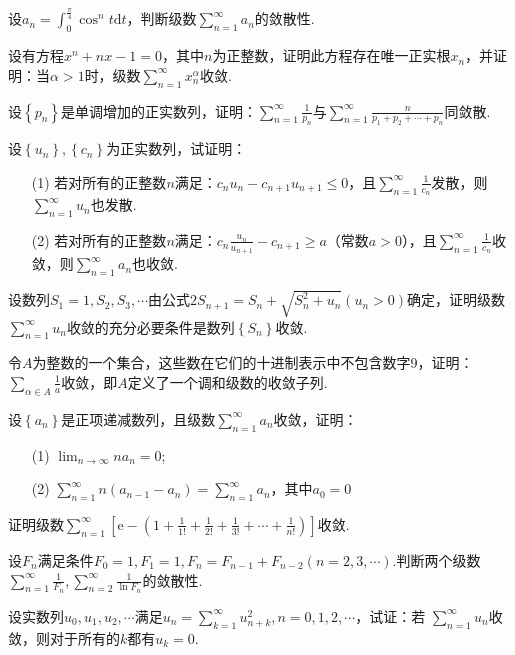 \begin{xiti}
	
	\item 设$a_{n}=\int_{0}^{\frac{\pi}{4}} \cos ^{n} t \mathrm{d} t$，判断级数$\sum_{n=1}^{\infty} a_{n}$的敛散性.
	\item 设有方程$x^{n}+n x-1=0$，其中$n$为正整数，证明此方程存在唯一正实根$x_{n}$，并证明：当$\alpha>1$时，级数$\sum_{n=1}^{\infty} x_{n}^{\alpha}$收敛.
	\item 设$\left\{p_{n}\right\}$是单调增加的正实数列，证明：$\sum_{n=1}^{\infty} \frac{1}{p_{n}}$与$\sum_{n=1}^{\infty} \frac{n}{p_{1}+p_{2}+\cdots+p_{n}}$同敛散.
	\item 设$\left\{u_{n}\right\},\left\{c_{n}\right\}$为正实数列，试证明：
	\begin{enumerate}
		\item [(1)]若对所有的正整数$n$满足：$c_{n} u_{n}-c_{n+1} u_{n+1} \leqslant 0$，且$\sum_{n=1}^{\infty} \frac{1}{c_{n}}$发散，则$\sum_{n=1}^{\infty} u_{n}$也发散.
		
		\item [(2)]若对所有的正整数$n$满足：$c_{n} \frac{u_{n}}{u_{n+1}}-c_{n+1} \geqslant a$（常数$a>0$），且$\sum_{n=1}^{\infty} \frac{1}{c_{n}}$收敛，则$\sum_{n=1}^{\infty} a_{n}$也收敛.
	\end{enumerate}
	\item 设数列$S_{1}=1, S_{2}, S_{3}, \cdots$由公式$2 S_{n+1}=S_{n}+\sqrt{S_{n}^{2}+u_{n}}\left(u_{n}>0\right)$确定，证明级数$\sum_{n=1}^{\infty} u_{n}$收敛的充分必要条件是数列$\left\{S_{n}\right\}$收敛.
	
	
	\item 令$A$为整数的一个集合，这些数在它们的十进制表示中不包含数字9，证明：$\sum_{\alpha \in A} \frac{1}{a}$收敛，即$A$定义了一个调和级数的收敛子列.
	
	\item 设$\left\{a_{n}\right\}$是正项递减数列，且级数$\sum_{n=1}^{\infty} a_{n}$收敛，证明：
	\begin{enumerate}
		\item [(1)]$\lim _{n \rightarrow \infty} n a_{n}=0$;
		\item [(2)]$\sum_{n=1}^{\infty} n\left(a_{n-1}-a_{n}\right)=\sum_{n=1}^{\infty} a_{n}$，其中$a_{0}=0$
	\end{enumerate}
	\item 证明级数$\sum_{n=1}^{\infty}\left[\mathrm{e}-\left(1+\frac{1}{1 !}+\frac{1}{2 !}+\frac{1}{3 !}+\cdots+\frac{1}{n !}\right)\right]$收敛.
	\item 设$F_{n}$满足条件$F_{0}=1, F_{1}=1, F_{n}=F_{n-1}+F_{n-2}(n=2,3, \cdots)$.判断两个级数$\sum_{n=1}^{\infty} \frac{1}{F_{n}}, \sum_{n=2}^{\infty} \frac{1}{\ln F_{n}}$的敛散性.
	\item 设实数列$u_{0}, u_{1}, u_{2}, \cdots$满足$u_{n}=\sum_{k=1}^{\infty} u_{n+k}^{2}, n=0,1,2, \cdots$，试证：若 $\sum_{n=1}^{\infty} u_{n}$收敛，则对于所有的$k$都有$u_{k}=0$.
	

\end{xiti}
